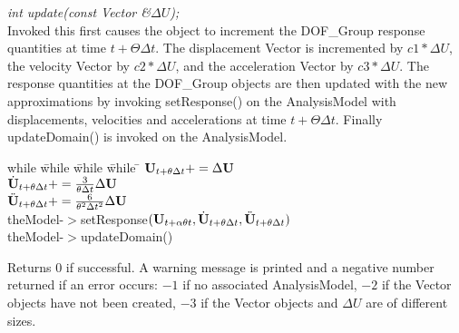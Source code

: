 {{\em int update(const Vector \&$\Delta U$);} \\
Invoked this first causes the object to increment the DOF\_Group
response quantities at time $t + \Theta \Delta t$. The displacement Vector is  
incremented by $ c1 * \Delta U$, the velocity Vector by $
c2 * \Delta U$, and the acceleration Vector by $c3 * \Delta U$. 
The response quantities at the DOF\_Group objects are then updated
with the new approximations by invoking setResponse() on the
AnalysisModel with displacements, velocities and accelerations at time
$t + \Theta \Delta t$.
Finally updateDomain() is invoked on the AnalysisModel. 
\begin{tabbing}
while \= while \= while \= while \= \kill
\>\> $ {\bf U}_{t + \theta \Delta t} += \Delta {\bf U}$ \\
\>\> $ \dot {{\bf U}}_{t + \theta \Delta t} += \frac{3}{\theta \Delta t}
\Delta {\bf U}  $\\
\>\> $ \ddot {{\bf U}}_{t + \theta \Delta t} += \frac{6}{\theta^2 \Delta
t^2} \Delta {\bf U} $ \\ 
\>\> theModel-$>$setResponse$({\bf U}_{t + \alpha \theta t}, \dot{\bf U}_{t+\theta
\Delta t}, \ddot{\bf U}_{t+ \theta \Delta t})$ \\
\>\> theModel-$>$updateDomain()
\end{tabbing}
Returns $0$ if successful. A warning message is printed and a negative number
returned if an error occurs: $-1$ if no associated AnalysisModel, $-2$
if the Vector objects have not been created, $-3$ if the Vector
objects and $\Delta U$ are of different sizes. \\



}
